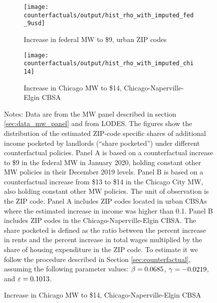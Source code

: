 \begin{figure}[h!]
    \centering
    \caption{Estimated shares pocketed by landlords under counterfactual MW policies}
    \label{fig:cf_hist_shares}

    \begin{subfigure}{0.75\textwidth} \centering
        \caption{Increase in federal MW to \$9, urban ZIP codes}
        \texttt{[image: counterfactuals/output/hist\_rho\_with\_imputed\_fed\_9usd]}
    \end{subfigure}

    \begin{subfigure}{0.75\textwidth} \centering
        \caption{Increase in Chicago MW to \$14, Chicago-Naperville-Elgin CBSA}
        \texttt{[image: counterfactuals/output/hist\_rho\_with\_imputed\_chi14]}
    \end{subfigure}

    \begin{minipage}{.95\textwidth} \footnotesize
        \vspace{3mm}
        Notes:
        Data are from the MW panel described in section \ref{sec:data_mw_panel} 
        and from LODES.
        The figures show the distribution of the estimated ZIP-code specific
        shares of additional income pocketed by landlords (``share pocketed'')
        under different counterfactual policies.
        Panel A is based on a counterfactual increase to \$9 in the 
        federal MW in January 2020, holding constant other MW policies in their 
        December 2019 levels.
        Panel B is based on a counterfactual increase from \$13 to \$14 in the 
        Chicago City MW, also holding constant other MW policies.
        The unit of observation is the ZIP code.
        Panel A includes ZIP codes located in urban CBSAs where the estimated 
        increase in income was higher than 0.1.
        Panel B includes ZIP codes in the Chicago-Naperville-Elgin CBSA.
        The share pocketed is defined as the ratio between the percent increase 
        in rents and the percent increase in total wages multiplied by the share 
        of housing expenditure in the ZIP code.
        To estimate it we follow the procedure described in Section 
        \ref{sec:counterfactual}, assuming the following parameter values: 
        $\beta = 0.0685$, $\gamma = -0.0219$, and $\varepsilon = 0.1013$.
    \end{minipage}
\end{figure}
